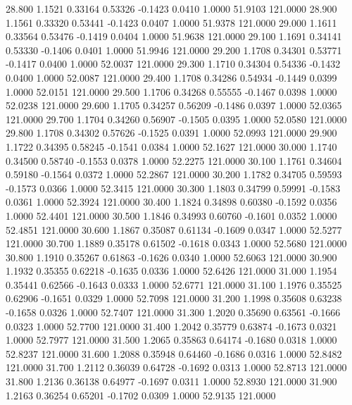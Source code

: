   28.800   1.1521   0.33164   0.53326  -0.1423   0.0410   1.0000  51.9103 121.0000
  28.900   1.1561   0.33320   0.53441  -0.1423   0.0407   1.0000  51.9378 121.0000
  29.000   1.1611   0.33564   0.53476  -0.1419   0.0404   1.0000  51.9638 121.0000
  29.100   1.1691   0.34141   0.53330  -0.1406   0.0401   1.0000  51.9946 121.0000
  29.200   1.1708   0.34301   0.53771  -0.1417   0.0400   1.0000  52.0037 121.0000
  29.300   1.1710   0.34304   0.54336  -0.1432   0.0400   1.0000  52.0087 121.0000
  29.400   1.1708   0.34286   0.54934  -0.1449   0.0399   1.0000  52.0151 121.0000
  29.500   1.1706   0.34268   0.55555  -0.1467   0.0398   1.0000  52.0238 121.0000
  29.600   1.1705   0.34257   0.56209  -0.1486   0.0397   1.0000  52.0365 121.0000
  29.700   1.1704   0.34260   0.56907  -0.1505   0.0395   1.0000  52.0580 121.0000
  29.800   1.1708   0.34302   0.57626  -0.1525   0.0391   1.0000  52.0993 121.0000
  29.900   1.1722   0.34395   0.58245  -0.1541   0.0384   1.0000  52.1627 121.0000
  30.000   1.1740   0.34500   0.58740  -0.1553   0.0378   1.0000  52.2275 121.0000
  30.100   1.1761   0.34604   0.59180  -0.1564   0.0372   1.0000  52.2867 121.0000
  30.200   1.1782   0.34705   0.59593  -0.1573   0.0366   1.0000  52.3415 121.0000
  30.300   1.1803   0.34799   0.59991  -0.1583   0.0361   1.0000  52.3924 121.0000
  30.400   1.1824   0.34898   0.60380  -0.1592   0.0356   1.0000  52.4401 121.0000
  30.500   1.1846   0.34993   0.60760  -0.1601   0.0352   1.0000  52.4851 121.0000
  30.600   1.1867   0.35087   0.61134  -0.1609   0.0347   1.0000  52.5277 121.0000
  30.700   1.1889   0.35178   0.61502  -0.1618   0.0343   1.0000  52.5680 121.0000
  30.800   1.1910   0.35267   0.61863  -0.1626   0.0340   1.0000  52.6063 121.0000
  30.900   1.1932   0.35355   0.62218  -0.1635   0.0336   1.0000  52.6426 121.0000
  31.000   1.1954   0.35441   0.62566  -0.1643   0.0333   1.0000  52.6771 121.0000
  31.100   1.1976   0.35525   0.62906  -0.1651   0.0329   1.0000  52.7098 121.0000
  31.200   1.1998   0.35608   0.63238  -0.1658   0.0326   1.0000  52.7407 121.0000
  31.300   1.2020   0.35690   0.63561  -0.1666   0.0323   1.0000  52.7700 121.0000
  31.400   1.2042   0.35779   0.63874  -0.1673   0.0321   1.0000  52.7977 121.0000
  31.500   1.2065   0.35863   0.64174  -0.1680   0.0318   1.0000  52.8237 121.0000
  31.600   1.2088   0.35948   0.64460  -0.1686   0.0316   1.0000  52.8482 121.0000
  31.700   1.2112   0.36039   0.64728  -0.1692   0.0313   1.0000  52.8713 121.0000
  31.800   1.2136   0.36138   0.64977  -0.1697   0.0311   1.0000  52.8930 121.0000
  31.900   1.2163   0.36254   0.65201  -0.1702   0.0309   1.0000  52.9135 121.0000
